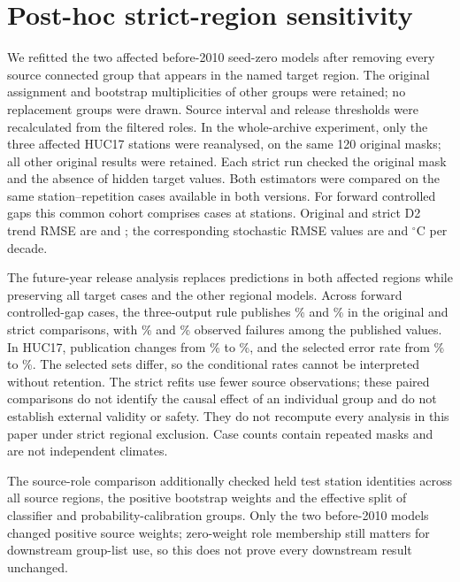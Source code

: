 \section{Post-hoc strict-region sensitivity}
We refitted the two affected before-2010 seed-zero models after removing every source connected group that appears in the named target region. The original assignment and bootstrap multiplicities of other groups were retained; no replacement groups were drawn. Source interval and release thresholds were recalculated from the filtered roles. In the whole-archive experiment, only the three affected HUC17 stations were reanalysed, on the same 120 original masks; all other original results were retained. Each strict run checked the original mask and the absence of hidden target values. Both estimators were compared on the same station--repetition cases available in both versions. For forward controlled gaps this common cohort comprises \SRPairN{} cases at \SRPairStations{} stations. Original and strict D2 trend RMSE are \SROldDTwo{} and \SRNewDTwo{}; the corresponding stochastic RMSE values are \SROldStoch{} and \SRNewStoch{} $^{\circ}$C per decade.

The future-year release analysis replaces predictions in both affected regions while preserving all target cases and the other regional models. Across \SRFutureN{} forward controlled-gap cases, the three-output rule publishes \SROldRet\% and \SRNewRet\% in the original and strict comparisons, with \SROldRisk\% and \SRNewRisk\% observed failures among the published values. In HUC17, publication changes from \SRHucOldRet\% to \SRHucNewRet\%, and the selected error rate from \SRHucOldRisk\% to \SRHucNewRisk\%. The selected sets differ, so the conditional rates cannot be interpreted without retention. The strict refits use fewer source observations; these paired comparisons do not identify the causal effect of an individual group and do not establish external validity or safety. They do not recompute every analysis in this paper under strict regional exclusion. Case counts contain repeated masks and are not independent climates.

The source-role comparison additionally checked held test station identities across all source regions, the positive bootstrap weights and the effective split of classifier and probability-calibration groups. Only the two before-2010 models changed positive source weights; zero-weight role membership still matters for downstream group-list use, so this does not prove every downstream result unchanged.


